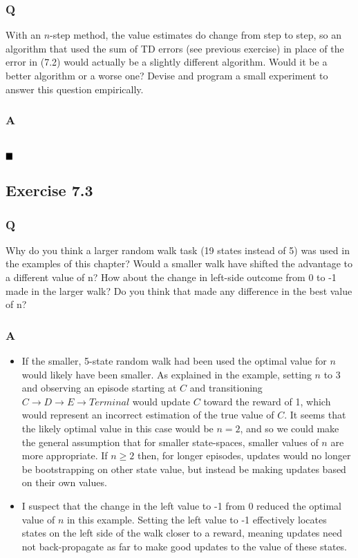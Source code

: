 \subsubsection{Q}
With an $n$-step method, the value estimates do change from step to step, so an algorithm that used the sum of TD errors (see previous exercise) in place of the error in (7.2) would actually be a slightly different algorithm. Would it be a better algorithm or a worse one? Devise and program a small experiment to answer this question empirically.
\subsubsection{A}
\ProgrammingExercise \\

$
\hfill \blacksquare
$

\subsection{Exercise 7.3}
\subsubsection{Q}
Why do you think a larger random walk task (19 states instead of 5) was used in the examples of this chapter? Would a smaller walk have shifted the advantage to a different value of n? How about the change in left-side outcome from 0 to -1 made in the larger walk? Do you think that made any difference in the best value of n?
\subsubsection{A}
\begin{itemize}
	\item If the smaller, 5-state random walk had been used the optimal value for $n$ would likely have been smaller. As explained in the example, setting $n$ to 3 and observing an episode starting at $C$ and transitioning $C \rightarrow D \rightarrow E \rightarrow Terminal$ would update $C$ toward the reward of 1, which would represent an incorrect estimation of the true value of $C$. It seems that the likely optimal value in this case would be $n = 2$, and so we could make the general assumption that for smaller state-spaces, smaller values of $n$ are more appropriate. If $n \geq 2$ then, for longer episodes, updates would no longer be bootstrapping on other state value, but instead be making updates based on their own values.
	\item I suspect that the change in the left value to -1 from 0 reduced the optimal value of $n$ in this example. Setting the left value to -1 effectively locates states on the left side of the walk closer to a reward, meaning updates need not back-propagate as far to make good updates to the value of these states. 
\end{itemize}

